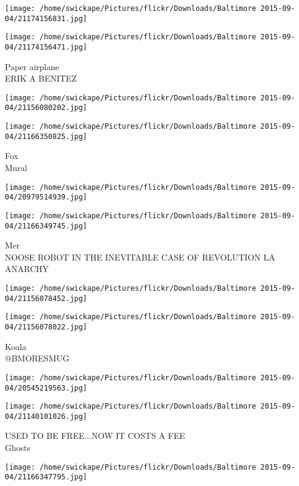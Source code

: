 \documentclass[10pt,letterpaper]{article}
\begin{document}
\texttt{[image: /home/swickape/Pictures/flickr/Downloads/Baltimore 2015-09-04/21174156831.jpg]}

\vspace{0.25in}
\texttt{[image: /home/swickape/Pictures/flickr/Downloads/Baltimore 2015-09-04/21174156471.jpg]}

Paper airplane\\
ERIK A BENITEZ
\pagebreak

\texttt{[image: /home/swickape/Pictures/flickr/Downloads/Baltimore 2015-09-04/21156080202.jpg]}

\vspace{0.25in}
\texttt{[image: /home/swickape/Pictures/flickr/Downloads/Baltimore 2015-09-04/21166350825.jpg]}

Fox\\
Mural
\pagebreak

\texttt{[image: /home/swickape/Pictures/flickr/Downloads/Baltimore 2015-09-04/20979514939.jpg]}

\vspace{0.25in}
\texttt{[image: /home/swickape/Pictures/flickr/Downloads/Baltimore 2015-09-04/21166349745.jpg]}

Mer\\
NOOSE ROBOT IN THE INEVITABLE CASE OF REVOLUTION LA ANARCHY
\pagebreak

\texttt{[image: /home/swickape/Pictures/flickr/Downloads/Baltimore 2015-09-04/21156078452.jpg]}

\vspace{0.25in}
\texttt{[image: /home/swickape/Pictures/flickr/Downloads/Baltimore 2015-09-04/21156078022.jpg]}

Koala\\
@BMORESMUG
\pagebreak

\texttt{[image: /home/swickape/Pictures/flickr/Downloads/Baltimore 2015-09-04/20545219563.jpg]}

\vspace{0.25in}
\texttt{[image: /home/swickape/Pictures/flickr/Downloads/Baltimore 2015-09-04/21140101026.jpg]}

USED TO BE FREE...NOW IT COSTS A FEE\\
Ghosts
\pagebreak

\texttt{[image: /home/swickape/Pictures/flickr/Downloads/Baltimore 2015-09-04/21166347795.jpg]}
\end{document}
